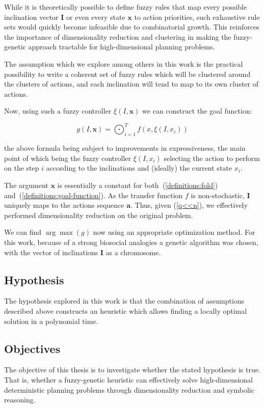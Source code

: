 \documentclass[11pt, a4paper]{article}
\begin{document}
	While it is theoretically possible to define fuzzy rules that map every possible inclination vector $\mathbf{I}$ or even every state $\mathbf{x}$ to action priorities, such exhaustive rule sets would quickly become infeasible due to combinatorial growth.
	This reinforces the importance of dimensionality reduction and clustering in making the fuzzy-genetic approach tractable for high-dimensional planning problems.

	The assumption which we explore among others in this work is the practical possibility to write a coherent set of fuzzy rules which will be clustered around the clusters of actions, and each inclination will tend to map to its own cluster of actions.
	
	Now, using such a fuzzy controller $\xi(I, \mathbf{x})$ we can construct the goal function:
	
	\begin{equation}\label{definitions:goal-function}
		g(I, \mathbf{x}) = \bigodot_{i=1}^{T} f(x, \xi(I, x_i))
	\end{equation}
	
	the above formula being subject to improvements in expressiveness,
	the main point of which being the fuzzy controller $\xi(I, x_i)$ selecting the action to perform on the step $i$ according to the inclinations and (ideally) the current state $x_i$.
	
	The argument $\mathbf{x}$ is essentially a constant for both~(\ref{definitions:fold}) and~(\ref{definitions:goal-function}).
	As the transfer function $f$ is non-stochastic, $\mathbf{I}$ uniquely maps to the actions sequence $\mathbf{a}$.
	Thus, given (\ref{q<<n}), we effectively performed dimensionality reduction on the original problem.
		
	We can find $\arg \max(g)$ now using an appropriate optimization method.
	For this work, because of a strong biosocial analogies a genetic algorithm\cite{mitchell1999geneticalgorithms} was chosen,
	with the vector of inclinations $\mathbf{I}$ as a chromosome.
	
	\subsection{Hypothesis}
	The hypothesis explored in this work is that the combination of assumptions described above constructs an heuristic which allows finding a locally optimal solution in a polynomial time.
	
	\subsection{Objectives}
	The objective of this thesis is to investigate whether the stated hypothesis is true.
	That is, whether a fuzzy-genetic heuristic can effectively solve high-dimensional deterministic planning problems through dimensionality reduction and symbolic reasoning.
	
\end{document}
